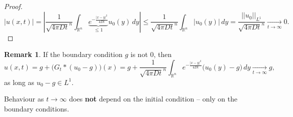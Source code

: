 \documentclass[12pt]{article}
\theoremstyle{definition}
\newtheorem*{remark}{Remark}
\begin{document}
\begin{proof}
\[\big|u(x,t)\big|=\left|\frac{1}{\sqrt{4\pi Dt}^n}\int_{\mathbb{R}^n}\underbrace{e^{-\frac{|x-y|^2}{4Dt}}}_{\leq1}u_0(y)\,dy\right|\leq\frac{1}{\sqrt{4\pi Dt}^n}\int_{\mathbb{R}^n}\big|u_0(y)\big|\,dy=\frac{||u_0||_{L^1}}{\sqrt{4\pi Dt}^n}\xrightarrow[t\to\infty]{}0.\]
\end{proof}

\begin{remark}
If the boundary condition $g$ is not $0$, then
\[u(x,t)=g+\big(G_t*(u_0-g)\big)(x)=g+\frac{1}{\sqrt{4\pi Dt}^n}\int_{\mathbb{R}^n}e^{-\frac{|x-y|^2}{4Dt}}\big(u_0(y)-g\big)\,dy\xrightarrow[t\to\infty]{}g,\]
as long as $u_0-g\in L^1$.
\end{remark}

Behaviour as $t\to\infty$ does \textbf{not} depend on the initial condition -- only on the boundary conditions.
\end{document}
